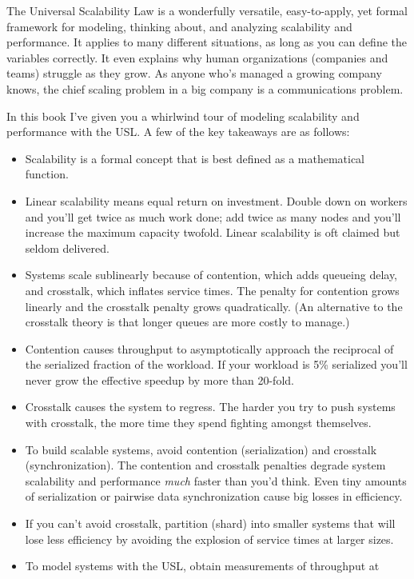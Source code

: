 \documentclass{vivid_layout}
\begin{document}
The Universal Scalability Law is a wonderfully versatile, easy-to-apply, yet
formal framework for modeling, thinking about, and analyzing scalability and
performance. It applies to many different situations, as long as you can define
the variables correctly. It even explains why human organizations (companies and
teams) struggle as they grow. As anyone who's managed a growing company knows,
the chief scaling problem in a big company is a communications problem.

In this book I've given you a whirlwind tour of modeling scalability and
performance with the USL. A few of the key takeaways are as follows:

\begin{itemize}
\item Scalability is a formal concept that is best defined as a mathematical
function.
\item Linear scalability means equal return on investment. Double down on
workers and you'll get twice as much work done; add twice as many nodes and
you'll increase the maximum capacity twofold. Linear scalability is oft claimed
but seldom delivered.
\item Systems scale sublinearly because of contention, which adds queueing
delay, and crosstalk, which inflates service times. The penalty for contention
grows linearly and the crosstalk penalty grows quadratically. (An alternative
to the crosstalk theory is that longer queues are more costly to manage.)
\item Contention causes throughput to asymptotically approach the
reciprocal of the serialized fraction of the workload. If your workload is 5\%
serialized you'll never grow the effective speedup by more than 20-fold.
\item Crosstalk causes the system to regress. The harder you try to push systems
with crosstalk, the more time they spend fighting amongst themselves.
\item To build scalable systems, avoid contention (serialization) and crosstalk
(synchronization).
The contention and crosstalk penalties degrade system scalability and
performance {\itshape much} faster than you'd think. Even tiny amounts of
serialization or pairwise data synchronization cause big losses in efficiency.
\item If you can't avoid crosstalk, partition (shard) into smaller systems that will
lose less efficiency by avoiding the explosion of service times at larger sizes.
\item To model systems with the USL, obtain measurements of throughput at

\end{itemize}
\end{document}
